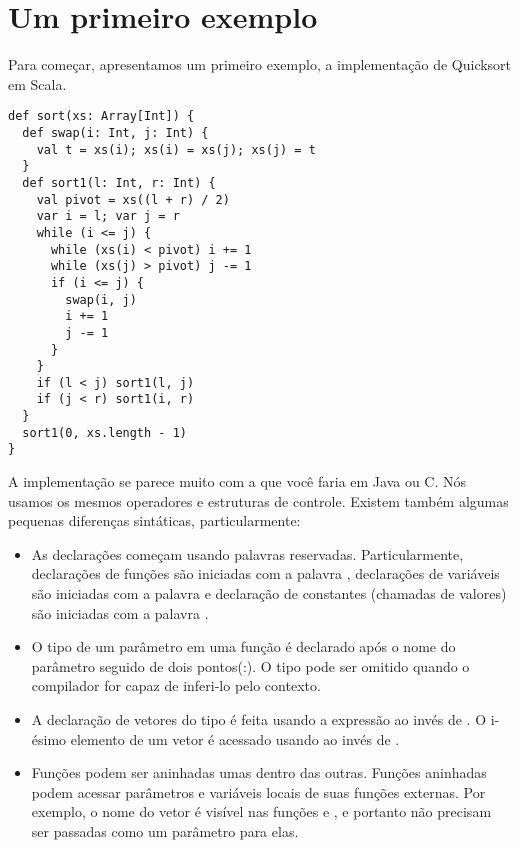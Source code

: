 \def\exercise{
   \def\theresult{Exercise~\thesection.\arabic{result}}
   \refstepcounter{result}
   \trivlist\item[\hskip
   \labelsep{\bf \theresult}]}
\def\endexercise{\endtrivlist}
 
\newcommand{\rewriteby}[1]{\mbox{\tab\tab\rm(#1)}}

\chapter{\label{chap:example-one}Um primeiro exemplo}

Para começar, apresentamos um primeiro exemplo, a implementação de Quicksort em Scala.

\begin{lstlisting}
def sort(xs: Array[Int]) {
  def swap(i: Int, j: Int) {
    val t = xs(i); xs(i) = xs(j); xs(j) = t
  }
  def sort1(l: Int, r: Int) {
    val pivot = xs((l + r) / 2)
    var i = l; var j = r
    while (i <= j) {
      while (xs(i) < pivot) i += 1
      while (xs(j) > pivot) j -= 1
      if (i <= j) { 
        swap(i, j)
        i += 1
        j -= 1
      }
    } 
    if (l < j) sort1(l, j)
    if (j < r) sort1(i, r)
  }
  sort1(0, xs.length - 1)
}
\end{lstlisting}

A implementação se parece muito com a que você faria em Java
ou C. Nós usamos os mesmos operadores e estruturas de controle.
Existem também algumas pequenas diferenças sintáticas, particularmente:
\begin{itemize}
\item
As declarações começam usando palavras reservadas. Particularmente, declarações de funções são iniciadas
com a palavra , declarações de variáveis são iniciadas com a palavra  e
declaração de constantes (chamadas de valores) são iniciadas com a palavra .
\item
O tipo de um parâmetro em uma função é declarado após o nome do parâmetro seguido de dois pontos(:).
O tipo pode ser omitido quando o compilador for capaz de inferi-lo pelo contexto.
\item
A  declaração de vetores do tipo  é feita usando a expressão  ao invés de . 
O i-ésimo elemento de um vetor  é acessado usando  ao invés de .
\item
Funções podem ser aninhadas umas dentro das outras. Funções aninhadas podem
acessar parâmetros e variáveis locais de suas funções externas. Por
exemplo, o nome do vetor  é visível nas funções  e 
, e portanto não precisam ser passadas como um parâmetro para elas.
\end{itemize}

